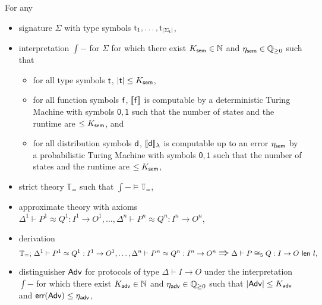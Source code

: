 
\begin{lemma}\label{lem:soundness_congruence_approximate_5}
For any
\begin{itemize}
\item \ipdl signature $\Sigma$ with type symbols $\mathsf{t}_1,\ldots,\mathsf{t}_{|\Sigma_\mathsf{t}|}$,

\item interpretation $\int{-}$ for $\Sigma$ for which there exist $K_{\mathsf{sem}} \in \mathbb{N}$ and $\eta_{\mathsf{sem}} \in \mathbb{Q}_{\geq 0}$ such that
\begin{itemize}
\item for all type symbols $\mathsf{t}$, $|\mathsf{t}| \leq K_{\mathsf{sem}}$,

\item for all function symbols $\mathsf{f}$, $\llbracket \mathsf{f} \rrbracket$ is computable by a deterministic Turing Machine with symbols $\mathsf{0}, \mathsf{1}$ such that the number of states and the runtime are $\leq K_{\mathsf{sem}}$, and

\item for all distribution symbols $\mathsf{d}$, $\llbracket \mathsf{d} \rrbracket_\lambda$ is computable up to an error $\eta_{\mathsf{sem}}$ by a probabilistic Turing Machine with symbols $\mathsf{0}, \mathsf{1}$ such that the number of states and the runtime are $\leq K_{\mathsf{sem}}$,
\end{itemize}

\item strict \ipdl theory $\mathbb{T}_=$ such that $\int{-} \vDash \mathbb{T}_=$,

\item approximate \ipdl theory with axioms $\Delta^1 \vdash P^1 \approx Q^1 : I^1 \to O^1, \ldots, \Delta^n \vdash P^n \approx Q^n : I^n \to O^n$,

\item derivation \[\mathbb{T}_=; \, \Delta^1 \vdash P^1 \approx Q^1 : I^1 \to O^1, \ldots, \Delta^n \vdash P^n \approx Q^n : I^n \to O^n \; \mathlarger{\mathlarger{\Rightarrow}} \; \Delta \vdash \lapproxcong{P}{Q}{I}{O}{l}{5},\]%

\item distinguisher $\mathsf{Adv}$ for protocols of type $\Delta \vdash I \to O$ under the interpretation $\int{-}$ for which there exist $K_{\mathsf{adv}} \in \mathbb{N}$ and $\eta_{\mathsf{adv}} \in \mathbb{Q}_{\geq 0}$ such that $|\mathsf{Adv}| \leq K_{\mathsf{adv}}$ and $\mathsf{err}(\mathsf{Adv}) \leq \eta_{\mathsf{adv}}$,


\end{itemize}
\end{lemma}
